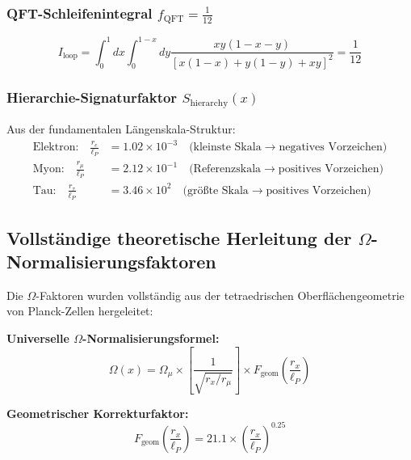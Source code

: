 \documentclass[12pt,a4paper]{article}
\numberwithin{equation}{section}
\newcommand{\fQFT}{f_{\text{QFT}}}
\newcommand{\lP}{\ell_P}
\newcommand{\Omegafactor}{\Omega}
\begin{document}
	\subsubsection{QFT-Schleifenintegral $\fQFT = \frac{1}{12}$}
	\begin{equation}
		I_{\text{loop}} = \int_0^1 dx \int_0^{1-x} dy \frac{xy(1-x-y)}{[x(1-x) + y(1-y) + xy]^2} = \frac{1}{12}
		\label{eq:loop_integral}
	\end{equation}
	
	\subsubsection{Hierarchie-Signaturfaktor $S_{\text{hierarchy}}(x)$}
	
	Aus der fundamentalen Längenskala-Struktur:
	\begin{align}
		\text{Elektron:} \quad \frac{r_e}{\ell_P} &= 1.02 \times 10^{-3} \quad \text{(kleinste Skala} \rightarrow \text{negatives Vorzeichen)}\\
		\text{Myon:} \quad \frac{r_\mu}{\ell_P} &= 2.12 \times 10^{-1} \quad \text{(Referenzskala} \rightarrow \text{positives Vorzeichen)}\\
		\text{Tau:} \quad \frac{r_\tau}{\ell_P} &= 3.46 \times 10^{2} \quad \text{(größte Skala} \rightarrow \text{positives Vorzeichen)}
		\label{eq:length_scales}
	\end{align}
	
	\subsection{Vollständige theoretische Herleitung der $\Omega$-Normalisierungsfaktoren}
	
	Die $\Omega$-Faktoren wurden vollständig aus der tetraedrischen Oberflächengeometrie von Planck-Zellen hergeleitet:
	
	\textbf{Universelle $\Omegafactor$-Normalisierungsformel:}
	\begin{equation}
		\Omegafactor(x) = \Omegafactor_\mu \times \left[\frac{1}{\sqrt{r_x/r_\mu}}\right] \times F_{\text{geom}}\left(\frac{r_x}{\lP}\right)
		\label{eq:omega_universal}
	\end{equation}
	
	\textbf{Geometrischer Korrekturfaktor:}
	\begin{equation}
		F_{\text{geom}}\left(\frac{r_x}{\lP}\right) = 21.1 \times \left(\frac{r_x}{\lP}\right)^{0.25}
		\label{eq:f_geom}
	\end{equation}
	
\end{document}
